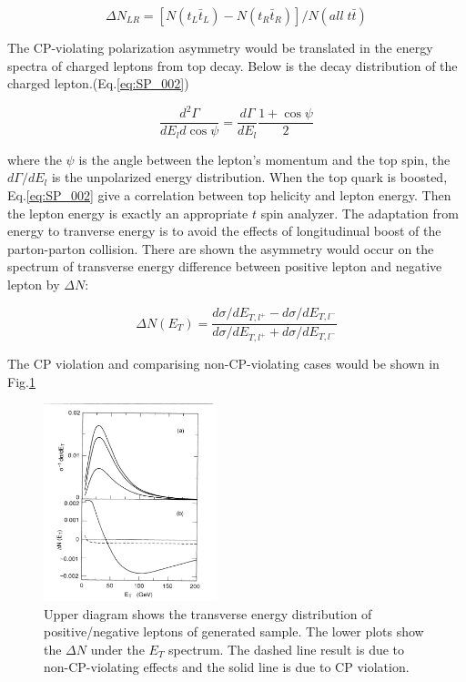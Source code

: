			\begin{equation}
			\Delta N_{LR} = [N(t_L \bar{t}_L)-N(t_R \bar{t}_R)]/N(all \; t\bar{t})
			\label{eq:SP_001}
			\end{equation}

			The CP-violating polarization asymmetry would be translated in the energy spectra of charged leptons from top decay. Below is the decay distribution of the charged lepton.(Eq.\ref{eq:SP_002})
			
			\begin{equation}
			\frac{d^2 \Gamma}{d E_l d \cos{\psi}} = \frac{d \Gamma}{d E_l} \frac{ 1 + \cos{\psi}}{2} 
			\label{eq:SP_002}
			\end{equation}

			where the $\psi$ is the angle between the lepton's momentum and the top spin, the $d\Gamma/dE_l$ is the unpolarized energy distribution. When the top quark is boosted, Eq.\ref{eq:SP_002} give a correlation between top helicity and lepton energy. Then the lepton energy is exactly an appropriate $t$ spin analyzer. The adaptation from energy to tranverse energy is to avoid the effects of longitudinual boost of the parton-parton collision. There are shown the asymmetry would occur on the spectrum of transverse energy difference between positive lepton and negative lepton by $\Delta N$:

			\begin{equation}
			\Delta N(E_T) = \frac{d\sigma/dE_{T,l^{+}} - d\sigma/dE_{T,l^{-}}}{d\sigma/dE_{T,l^{+}} + d\sigma/dE_{T,l^{-}}}
			\label{eq:SP_003}
			\end{equation}

			The CP violation and comparising non-CP-violating cases would be shown in Fig.\ref{Obs:fig:SP_ex}

			\begin{figure}[H]
			\centering
			    \includegraphics[width=0.45\textwidth]{Figures/Observables/SchmidPeskin.png}
			\caption{Upper diagram shows the transverse energy distribution of positive/negative leptons of generated sample. The lower plots show the $\Delta N$ under the $E_T$ spectrum. The dashed line result is due to non-CP-violating effects and the solid line is due to CP violation.}
			\label{Obs:fig:SP_ex}
			\end{figure}
			\FloatBarrier

